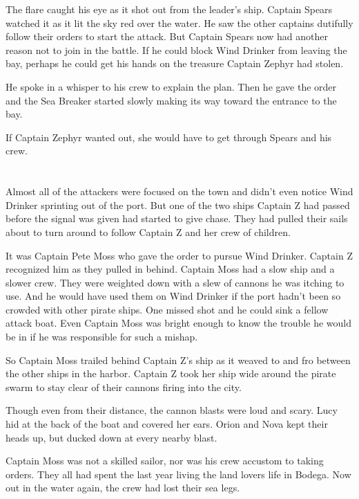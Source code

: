 \documentclass[12pt]{extbook}
\begin{document}
  The flare caught his eye as it shot out from the leader's ship. Captain
  Spears watched it as it lit the sky red over the water. He saw the other
  captains dutifully follow their orders to start the attack. But Captain
  Spears now had another reason not to join in the battle. If he could
  block Wind Drinker from leaving the bay, perhaps he could get his hands
  on the treasure Captain Zephyr had stolen.
  
  He spoke in a whisper to his crew to explain the plan. Then he gave the
  order and the Sea Breaker started slowly making its way toward the
  entrance to the bay.
  
  If Captain Zephyr wanted out, she would have to get through Spears and
  his crew.
  
  \section{}\label{section-37}
  
  Almost all of the attackers were focused on the town and didn't even
  notice Wind Drinker sprinting out of the port. But one of the two ships
  Captain Z had passed before the signal was given had started to give
  chase. They had pulled their sails about to turn around to follow
  Captain Z and her crew of children.
  
  It was Captain Pete Moss who gave the order to pursue Wind Drinker.
  Captain Z recognized him as they pulled in behind. Captain Moss had a
  slow ship and a slower crew. They were weighted down with a slew of
  cannons he was itching to use. And he would have used them on Wind
  Drinker if the port hadn't been so crowded with other pirate ships. One
  missed shot and he could sink a fellow attack boat. Even Captain Moss
  was bright enough to know the trouble he would be in if he was
  responsible for such a mishap.
  
  So Captain Moss trailed behind Captain Z's ship as it weaved to and fro
  between the other ships in the harbor. Captain Z took her ship wide
  around the pirate swarm to stay clear of their cannons firing into the
  city.
  
  Though even from their distance, the cannon blasts were loud and scary.
  Lucy hid at the back of the boat and covered her ears. Orion and Nova
  kept their heads up, but ducked down at every nearby blast.
  
  Captain Moss was not a skilled sailor, nor was his crew accustom to
  taking orders. They all had spent the last year living the land lovers
  life in Bodega. Now out in the water again, the crew had lost their sea
  legs.
  
\end{document}
